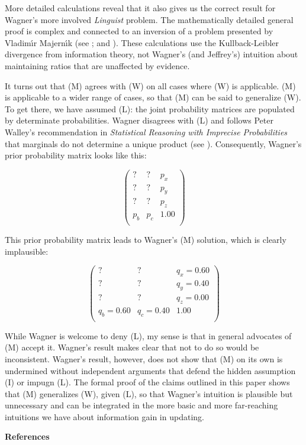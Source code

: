 \documentclass[11pt]{article}
\begin{document}
More detailed calculations reveal that it also gives us the correct
result for Wagner's more involved \emph{Linguist} problem. The
mathematically detailed general proof is complex and connected to an
inversion of a problem presented by Vladim{\'\i}r Majern{\'\i}k (see
; and ). These
calculations use the Kullback-Leibler divergence from information
theory, not Wagner's (and Jeffrey's) intuition about maintaining
ratios that are unaffected by evidence.

It turns out that (M) agrees with (W) on all cases where (W) is
applicable. (M) is applicable to a wider range of cases, so that (M)
can be said to generalize (W). To get there, we have assumed (L): the
joint probability matrices are populated by determinate probabilities.
Wagner disagrees with (L) and follows Peter Walley's recommendation in
\emph{Statistical Reasoning with Imprecise Probabilities} that
marginals do not determine a unique product (see
). Consequently, Wagner's prior probability
matrix looks like this:

\begin{equation}
  \label{eq:e3}
  \left(
    \begin{array}{ccc}
      ? & ? & p_{x} \\
      ? & ? & p_{y} \\
      ? & ? & p_{z} \\
      p_{b} & p_{c} & 1.00 \\
    \end{array}\right)
\end{equation}

This prior probability matrix leads to Wagner's (M) solution, which is
clearly implausible:

\begin{equation}
  \label{eq:e4}
  \left(
    \begin{array}{ccc}
      ? & ? & q_{x}=0.60 \\
      ? & ? & q_{y}=0.40 \\
      ? & ? & q_{z}=0.00 \\
      q_{b}=0.60 & q_{c}=0.40 & 1.00 \\
    \end{array}\right)
\end{equation}

While Wagner is welcome to deny (L), my sense is that in general
advocates of (M) accept it. Wagner's result makes clear that not to do
so would be inconsistent. Wagner's result, however, does not show that
(M) on its own is undermined without independent arguments that defend
the hidden assumption (I) or impugn (L). The formal proof of the
claims outlined in this paper shows that (M) generalizes (W), given
(L), so that Wagner's intuition is plausible but unnecessary and can
be integrated in the more basic and more far-reaching intuitions we
have about information gain in updating.

\bigskip

\bigskip

\textbf{References}



\end{document}
